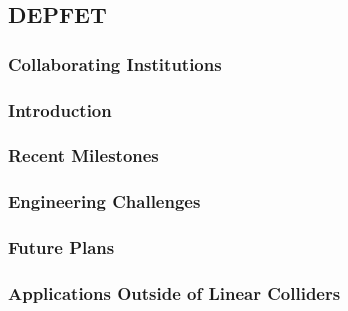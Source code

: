 \subsection{DEPFET}
\subsubsection{Collaborating Institutions}
\subsubsection{Introduction}
\subsubsection{Recent Milestones}
\subsubsection{Engineering Challenges}
\subsubsection{Future Plans}
\subsubsection{Applications Outside of Linear Colliders}
